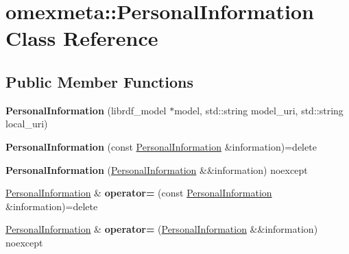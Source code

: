 \hypertarget{classomexmeta_1_1PersonalInformation}{}\section{omexmeta\+:\+:Personal\+Information Class Reference}
\label{classomexmeta_1_1PersonalInformation}
\subsection*{Public Member Functions}
\begin{DoxyCompactItemize}
\item 
\mbox{\label{classomexmeta_1_1PersonalInformation_a7494a26893d42e33953dee18bc6db4e4}} 
{\bfseries Personal\+Information} (librdf\+\_\+model $\ast$model, std\+::string model\+\_\+uri, std\+::string local\+\_\+uri)
\item 
\mbox{\label{classomexmeta_1_1PersonalInformation_a75cedb2a97efb996852b4e7cd39d6440}} 
{\bfseries Personal\+Information} (const \hyperlink{classomexmeta_1_1PersonalInformation}{Personal\+Information} \&information)=delete
\item 
\mbox{\label{classomexmeta_1_1PersonalInformation_a6653d6c5751154f5f33562d9879d6727}} 
{\bfseries Personal\+Information} (\hyperlink{classomexmeta_1_1PersonalInformation}{Personal\+Information} \&\&information) noexcept
\item 
\mbox{\label{classomexmeta_1_1PersonalInformation_a11a759dd5f065ba6a48f0bc3b4c48438}} 
\hyperlink{classomexmeta_1_1PersonalInformation}{Personal\+Information} \& {\bfseries operator=} (const \hyperlink{classomexmeta_1_1PersonalInformation}{Personal\+Information} \&information)=delete
\item 
\mbox{\label{classomexmeta_1_1PersonalInformation_a048a3377b27d4b87681e4f8c24dd8c4f}} 
\hyperlink{classomexmeta_1_1PersonalInformation}{Personal\+Information} \& {\bfseries operator=} (\hyperlink{classomexmeta_1_1PersonalInformation}{Personal\+Information} \&\&information) noexcept
\item 
\mbox{\label{classomexmeta_1_1PersonalInformation_aef8b8cfd83f8247b487d58f887c93e54}} 

\end{DoxyCompactItemize}
